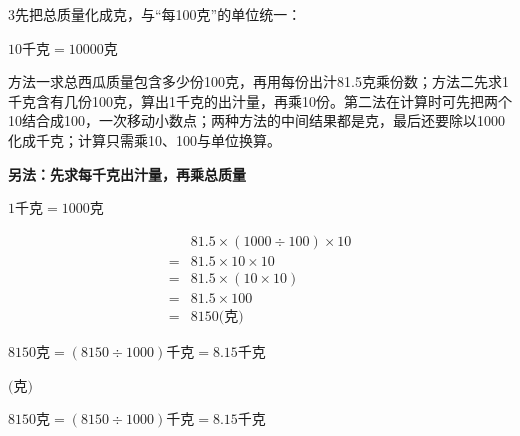 \documentclass[multi=snippet,border={5bp 20bp 5bp 5bp}]{standalone}
\newenvironment{snippet}[3]{\begin{minipage}{#1bp}\color{answerred}\fontsize{#2}{#3}\selectfont\raggedright}{\end{minipage}}
\begin{document}
\begin{snippet}{505}{11.5}{14}\begin{multicols}{3}\raggedcolumns 先把总质量化成克，与“每100克”的单位统一：\par\noindent\(\displaystyle 10\text{千克}=10000\text{克}\)\allowbreak \par 方法一求总西瓜质量包含多少份100克，再用每份出汁81.5克乘份数；方法二先求1千克含有几份100克，算出1千克的出汁量，再乘10份。第二法在计算时可先把两个10结合成100，一次移动小数点；两种方法的中间结果都是克，最后还要除以1000化成千克；计算只需乘10、100与单位换算。\par \textbf{另法：先求每千克出汁量，再乘总质量}\par \noindent\(\displaystyle 1\text{千克}=1000\text{克}\)\allowbreak \par \noindent\[\displaystyle \begin{aligned}&81.5\times(1000\div100)\times10\\={}&81.5\times10\times10\\={}&81.5\times(10\times10)\\={}&81.5\times100\\={}&8150\text{(克)}\end{aligned}\]\par \noindent\(\displaystyle 8150\text{克}=(8150\div1000)\text{千克}=8.15\text{千克}\)\allowbreak \par\end{multicols}\end{snippet}
\begin{snippet}{80}{9.0}{14}\SourceSans\setlength{\mathindent}{2bp}\(\text{(克)}\)\end{snippet}
\begin{snippet}{505}{9.0}{14}\SourceSans\setlength{\mathindent}{2bp}\(8150\text{克}=(8150\div1000)\text{千克}=8.15\text{千克}\)\end{snippet}
\end{document}

